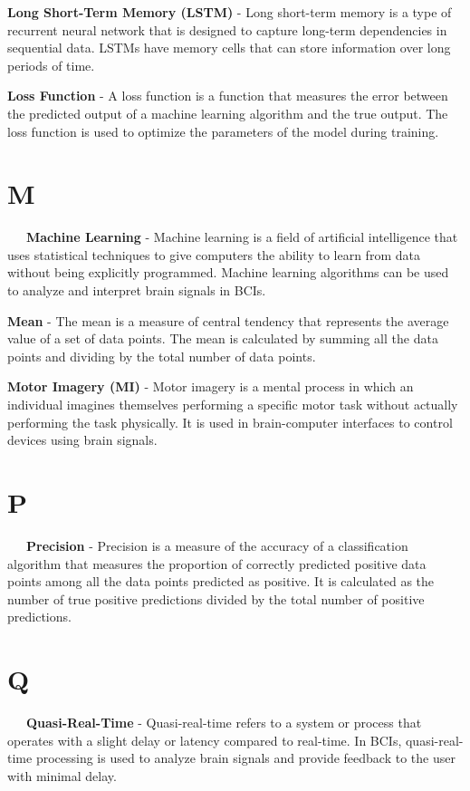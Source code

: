 \textbf{Long Short-Term Memory (LSTM)} - Long short-term memory is a type of recurrent neural network that is designed to capture long-term dependencies in sequential data. LSTMs have memory cells that can store information over long periods of time.

\textbf{Loss Function} - A loss function is a function that measures the error between the predicted output of a machine learning algorithm and the true output. The loss function is used to optimize the parameters of the model during training.

\section*{M}

\-\ \-\ \-\ \textbf{Machine Learning} - Machine learning is a field of artificial intelligence that uses statistical techniques to give computers the ability to learn from data without being explicitly programmed. Machine learning algorithms can be used to analyze and interpret brain signals in BCIs.

\textbf{Mean} - The mean is a measure of central tendency that represents the average value of a set of data points. The mean is calculated by summing all the data points and dividing by the total number of data points.

\textbf{Motor Imagery (MI)} - Motor imagery is a mental process in which an individual imagines themselves performing a specific motor task without actually performing the task physically. It is used in brain-computer interfaces to control devices using brain signals.

\section*{P}

\-\ \-\ \-\ \textbf{Precision} - Precision is a measure of the accuracy of a classification algorithm that measures the proportion of correctly predicted positive data points among all the data points predicted as positive. It is calculated as the number of true positive predictions divided by the total number of positive predictions.

\section*{Q}

\-\ \-\ \-\ \textbf{Quasi-Real-Time} - Quasi-real-time refers to a system or process that operates with a slight delay or latency compared to real-time. In BCIs, quasi-real-time processing is used to analyze brain signals and provide feedback to the user with minimal delay.

